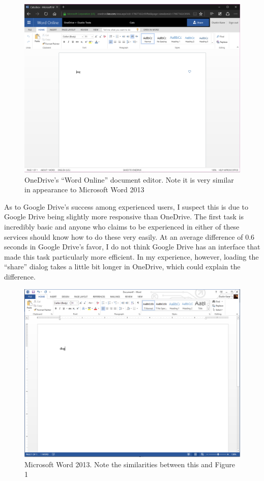 \documentclass[a4paper,12pt]{article}
\begin{document}
\begin{figure}[h]
\centering
\includegraphics[width=\textwidth]{onedrive}
\caption{OneDrive's ``Word Online'' document editor. Note it is very similar in appearance to Microsoft Word 2013}
\end{figure}

As to Google Drive's success among experienced users, I suspect this is due to Google Drive being slightly more responsive than OneDrive. The first task is incredibly basic and anyone who claims to be experienced in either of these services should know how to do these very easily. At an average difference of 0.6 seconds in Google Drive's favor, I do not think Google Drive has an interface that made this task particularly more efficient. In my experience, however, loading the ``share'' dialog takes a little bit longer in OneDrive, which could explain the difference.

\begin{figure}[h]
\centering
\includegraphics[width=\textwidth]{word}
\caption{Microsoft Word 2013. Note the similarities between this and Figure 1}
\end{figure}
\end{document}
